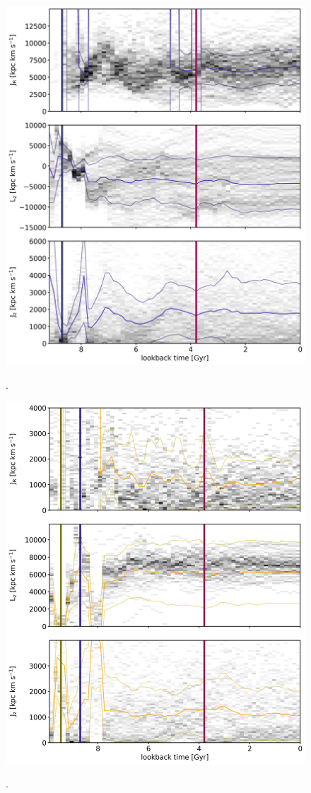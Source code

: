\begin{figure}
\captionsetup{format=plain}
    \centering
	\includegraphics[width=\textwidth]{plots/Dynamics/prog3/action_time_evolution_hist_mean.png}
    \label{fig:time_ev_box_GCs}
    \caption{.}\label{fig:actions_time_evolution}
\end{figure}

\begin{figure}[htbp]
\captionsetup{format=plain}
    \centering
	\includegraphics[width=\textwidth]{plots/Dynamics/prog4/action_time_evolution_hist_mean.png}
    \label{fig:time_ev_box_GCs}
    \caption{.}\label{fig:actions_time_evolution}
\end{figure}
